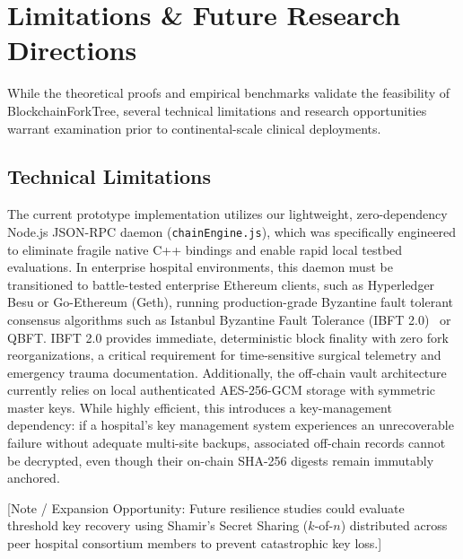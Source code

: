 \section{Limitations \& Future Research Directions}
\label{sec:limitations_future}

While the theoretical proofs and empirical benchmarks validate the feasibility of BlockchainForkTree, several technical limitations and research opportunities warrant examination prior to continental-scale clinical deployments.

\subsection{Technical Limitations}
The current prototype implementation utilizes our lightweight, zero-dependency Node.js JSON-RPC daemon (\texttt{chainEngine.js}), which was specifically engineered to eliminate fragile native C++ bindings and enable rapid local testbed evaluations. In enterprise hospital environments, this daemon must be transitioned to battle-tested enterprise Ethereum clients, such as Hyperledger Besu or Go-Ethereum (Geth), running production-grade Byzantine fault tolerant consensus algorithms such as Istanbul Byzantine Fault Tolerance (IBFT 2.0)~\cite{saltini2020ibft} or QBFT. IBFT 2.0 provides immediate, deterministic block finality with zero fork reorganizations, a critical requirement for time-sensitive surgical telemetry and emergency trauma documentation. Additionally, the off-chain vault architecture currently relies on local authenticated AES-256-GCM storage with symmetric master keys. While highly efficient, this introduces a key-management dependency: if a hospital's key management system experiences an unrecoverable failure without adequate multi-site backups, associated off-chain records cannot be decrypted, even though their on-chain SHA-256 digests remain immutably anchored.

[Note / Expansion Opportunity: Future resilience studies could evaluate threshold key recovery using Shamir's Secret Sharing ($k$-of-$n$) distributed across peer hospital consortium members to prevent catastrophic key loss.]

